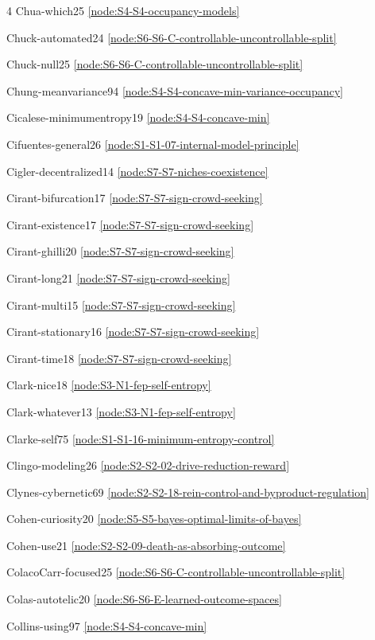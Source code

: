 \documentclass[10pt]{article}
\begin{document}
{\begin{multicols}{4}
Chua-which25 \hfill \ref{node:S4-S4-occupancy-models}\par
Chuck-automated24 \hfill \ref{node:S6-S6-C-controllable-uncontrollable-split}\par
Chuck-null25 \hfill \ref{node:S6-S6-C-controllable-uncontrollable-split}\par
Chung-meanvariance94 \hfill \ref{node:S4-S4-concave-min-variance-occupancy}\par
Cicalese-minimumentropy19 \hfill \ref{node:S4-S4-concave-min}\par
Cifuentes-general26 \hfill \ref{node:S1-S1-07-internal-model-principle}\par
Cigler-decentralized14 \hfill \ref{node:S7-S7-niches-coexistence}\par
Cirant-bifurcation17 \hfill \ref{node:S7-S7-sign-crowd-seeking}\par
Cirant-existence17 \hfill \ref{node:S7-S7-sign-crowd-seeking}\par
Cirant-ghilli20 \hfill \ref{node:S7-S7-sign-crowd-seeking}\par
Cirant-long21 \hfill \ref{node:S7-S7-sign-crowd-seeking}\par
Cirant-multi15 \hfill \ref{node:S7-S7-sign-crowd-seeking}\par
Cirant-stationary16 \hfill \ref{node:S7-S7-sign-crowd-seeking}\par
Cirant-time18 \hfill \ref{node:S7-S7-sign-crowd-seeking}\par
Clark-nice18 \hfill \ref{node:S3-N1-fep-self-entropy}\par
Clark-whatever13 \hfill \ref{node:S3-N1-fep-self-entropy}\par
Clarke-self75 \hfill \ref{node:S1-S1-16-minimum-entropy-control}\par
Clingo-modeling26 \hfill \ref{node:S2-S2-02-drive-reduction-reward}\par
Clynes-cybernetic69 \hfill \ref{node:S2-S2-18-rein-control-and-byproduct-regulation}\par
Cohen-curiosity20 \hfill \ref{node:S5-S5-bayes-optimal-limits-of-bayes}\par
Cohen-use21 \hfill \ref{node:S2-S2-09-death-as-absorbing-outcome}\par
ColacoCarr-focused25 \hfill \ref{node:S6-S6-C-controllable-uncontrollable-split}\par
Colas-autotelic20 \hfill \ref{node:S6-S6-E-learned-outcome-spaces}\par
Collins-using97 \hfill \ref{node:S4-S4-concave-min}\par

\end{multicols}}
\end{document}
